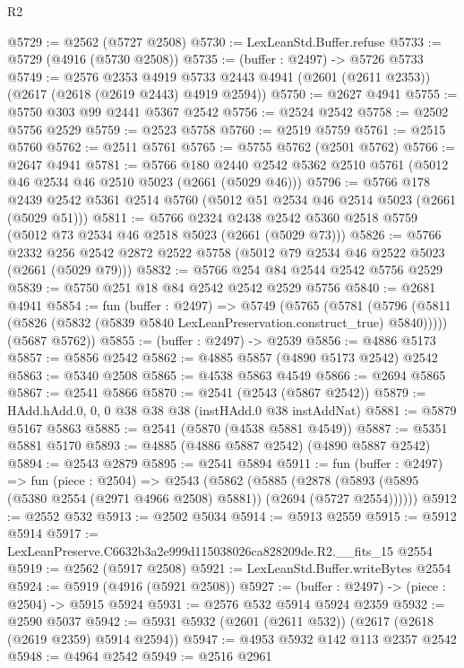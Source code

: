 \begin{lexlean}{R2}
\begin{coremodule}
@5729 := @2562 (@5727 @2508)
@5730 := LexLeanStd.Buffer.refuse
@5733 := @5729 (@4916 (@5730 @2508))
@5735 := (buffer : @2497) -> @5726 @5733
@5749 := @2576
    @2353
    @4919
    @5733
    @2443
    @4941
    (@2601 (@2611 @2353))
    (@2617 (@2618 (@2619 @2443) @4919 @2594))
@5750 := @2627 @4941
@5755 := @5750 @303 @99 @2441 @5367 @2542
@5756 := @2524 @2542
@5758 := @2502 @5756 @2529
@5759 := @2523 @5758
@5760 := @2519 @5759
@5761 := @2515 @5760
@5762 := @2511 @5761
@5765 := @5755 @5762 (@2501 @5762)
@5766 := @2647 @4941
@5781 := @5766
    @180
    @2440
    @2542
    @5362
    @2510
    @5761
    (@5012 @46 @2534 @46 @2510 @5023 (@2661 (@5029 @46)))
@5796 := @5766
    @178
    @2439
    @2542
    @5361
    @2514
    @5760
    (@5012 @51 @2534 @46 @2514 @5023 (@2661 (@5029 @51)))
@5811 := @5766
    @2324
    @2438
    @2542
    @5360
    @2518
    @5759
    (@5012 @73 @2534 @46 @2518 @5023 (@2661 (@5029 @73)))
@5826 := @5766
    @2332
    @256
    @2542
    @2872
    @2522
    @5758
    (@5012 @79 @2534 @46 @2522 @5023 (@2661 (@5029 @79)))
@5832 := @5766 @254 @84 @2544 @2542 @5756 @2529
@5839 := @5750 @251 @18 @84 @2542 @2542 @2529 @5756
@5840 := @2681 @4941
@5854 := fun (buffer : @2497) =>
  @5749
    (@5765
      (@5781 (@5796 (@5811 (@5826 (@5832 (@5839 @5840 LexLeanPreservation.construct_true) @5840)))))
      (@5687 @5762))
@5855 := (buffer : @2497) -> @2539
@5856 := @4886 @5173
@5857 := @5856 @2542
@5862 := @4885 @5857 (@4890 @5173 @2542) @2542
@5863 := @5340 @2508
@5865 := @4538 @5863 @4549
@5866 := @2694 @5865
@5867 := @2541 @5866
@5870 := @2541 (@2543 (@5867 @2542))
@5879 := HAdd.hAdd.{0, 0, 0} @38 @38 @38 (instHAdd.{0} @38 instAddNat)
@5881 := @5879 @5167 @5863
@5885 := @2541 (@5870 (@4538 @5881 @4549))
@5887 := @5351 @5881 @5170
@5893 := @4885 (@4886 @5887 @2542) (@4890 @5887 @2542)
@5894 := @2543 @2879
@5895 := @2541 @5894
@5911 := fun (buffer : @2497) =>
  fun (piece : @2504) =>
  @2543
    (@5862
      (@5885 (@2878 (@5893 (@5895 (@5380 @2554 (@2971 @4966 @2508) @5881)) (@2694 (@5727 @2554))))))
@5912 := @2552 @532
@5913 := @2502 @5034
@5914 := @5913 @2559
@5915 := @5912 @5914
@5917 := LexLeanPreserve.C6632b3a2e999d115038026ca828209de.R2.__fits_15 @2554
@5919 := @2562 (@5917 @2508)
@5921 := LexLeanStd.Buffer.writeBytes @2554
@5924 := @5919 (@4916 (@5921 @2508))
@5927 := (buffer : @2497) -> (piece : @2504) -> @5915 @5924
@5931 := @2576 @532 @5914 @5924 @2359
@5932 := @2590 @5037
@5942 := @5931 @5932 (@2601 (@2611 @532)) (@2617 (@2618 (@2619 @2359) @5914 @2594))
@5947 := @4953 @5932 @142 @113 @2357 @2542
@5948 := @4964 @2542
@5949 := @2516 @2961

\end{coremodule}
\end{lexlean}
